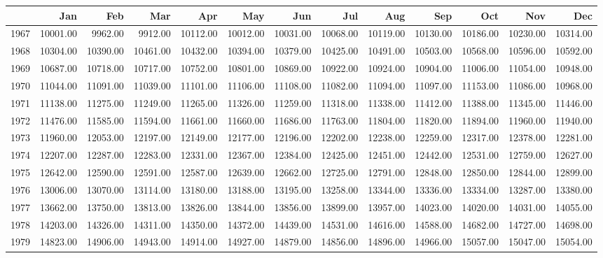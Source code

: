 \begin{longtable}{rrrrrrrrrrrrr}
  \hline
 & Jan & Feb & Mar & Apr & May & Jun & Jul & Aug & Sep & Oct & Nov & Dec \\ 
  \hline
1967 & 10001.00 & 9962.00 & 9912.00 & 10112.00 & 10012.00 & 10031.00 & 10068.00 & 10119.00 & 10130.00 & 10186.00 & 10230.00 & 10314.00 \\ 
  1968 & 10304.00 & 10390.00 & 10461.00 & 10432.00 & 10394.00 & 10379.00 & 10425.00 & 10491.00 & 10503.00 & 10568.00 & 10596.00 & 10592.00 \\ 
  1969 & 10687.00 & 10718.00 & 10717.00 & 10752.00 & 10801.00 & 10869.00 & 10922.00 & 10924.00 & 10904.00 & 11006.00 & 11054.00 & 10948.00 \\ 
  1970 & 11044.00 & 11091.00 & 11039.00 & 11101.00 & 11106.00 & 11108.00 & 11082.00 & 11094.00 & 11097.00 & 11153.00 & 11086.00 & 10968.00 \\ 
  1971 & 11138.00 & 11275.00 & 11249.00 & 11265.00 & 11326.00 & 11259.00 & 11318.00 & 11338.00 & 11412.00 & 11388.00 & 11345.00 & 11446.00 \\ 
  1972 & 11476.00 & 11585.00 & 11594.00 & 11661.00 & 11660.00 & 11686.00 & 11763.00 & 11804.00 & 11820.00 & 11894.00 & 11960.00 & 11940.00 \\ 
  1973 & 11960.00 & 12053.00 & 12197.00 & 12149.00 & 12177.00 & 12196.00 & 12202.00 & 12238.00 & 12259.00 & 12317.00 & 12378.00 & 12281.00 \\ 
  1974 & 12207.00 & 12287.00 & 12283.00 & 12331.00 & 12367.00 & 12384.00 & 12425.00 & 12451.00 & 12442.00 & 12531.00 & 12759.00 & 12627.00 \\ 
  1975 & 12642.00 & 12590.00 & 12591.00 & 12587.00 & 12639.00 & 12662.00 & 12725.00 & 12791.00 & 12848.00 & 12850.00 & 12844.00 & 12899.00 \\ 
  1976 & 13006.00 & 13070.00 & 13114.00 & 13180.00 & 13188.00 & 13195.00 & 13258.00 & 13344.00 & 13336.00 & 13334.00 & 13287.00 & 13380.00 \\ 
  1977 & 13662.00 & 13750.00 & 13813.00 & 13826.00 & 13844.00 & 13856.00 & 13899.00 & 13957.00 & 14023.00 & 14020.00 & 14031.00 & 14055.00 \\ 
  1978 & 14203.00 & 14326.00 & 14311.00 & 14350.00 & 14372.00 & 14439.00 & 14531.00 & 14616.00 & 14588.00 & 14682.00 & 14727.00 & 14698.00 \\ 
  1979 & 14823.00 & 14906.00 & 14943.00 & 14914.00 & 14927.00 & 14879.00 & 14856.00 & 14896.00 & 14966.00 & 15057.00 & 15047.00 & 15054.00 \\ 

\end{longtable}
